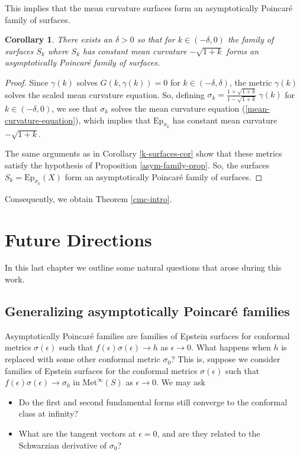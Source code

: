 \documentclass{amsart}
\newtheorem{cor}[thm]{Corollary}
\begin{document}
This implies that the mean curvature surfaces form an asymptotically Poincar\'e family of surfaces. 

\begin{cor}
There exists an $\delta > 0$ so that for $k \in (-\delta, 0)$ the family of surfaces $S_k$ where $S_k$ has constant mean curvature $-\sqrt{1+k}$ forms an asymptotically Poincar\'e family of surfaces. 
\end{cor}

\begin{proof}
Since $\gamma(k)$ solves $G(k,\gamma(k)) = 0$ for $k \in (-\delta,\delta)$, the metric $\gamma(k)$ solves the scaled mean curvature equation. 
So, defining $\sigma_k = \frac{1 + \sqrt{1+k}}{1 - \sqrt{1+k}} \ \gamma(k)$ for $k \in (-\delta,0)$, we see that $\sigma_k$ solves the mean curvature equation (\ref{mean-curvature-equation}), which implies that $\mathrm{Ep}_{\sigma_k}$ has constant mean curvature $-\sqrt{1+k}$.

The same arguments as in Corollary \ref{k-surfaces-cor} show that these metrics satisfy the hypothesis of Proposition \ref{asym-family-prop}.
So, the surfaces $S_k = \mathrm{Ep}_{\sigma_{k}}(X)$ form an asymptotically Poincar\'e family of surfaces. 
\end{proof}

Consequently, we obtain Theorem \ref{cmc-intro}.


\section{Future Directions}


In this last chapter we outline some natural questions that arose during this work.



\subsection{Generalizing asymptotically Poincar\'e families}



Asymptotically Poincar\'e families are families of Epstein surfaces for conformal metrics $\sigma(\epsilon)$ such that $f(\epsilon)\sigma(\epsilon) \to h$ as $\epsilon \to 0$.
What happens when $h$ is replaced with some other conformal metric $\sigma_0$?
This is, suppose we consider families of Epstein surfaces for the conformal metrics $\sigma(\epsilon)$ such that $f(\epsilon)\sigma(\epsilon) \to \sigma_0$ in $\mathrm{Met}^\infty(S)$ as $\epsilon \to 0$.
We may ask
\begin{itemize}
\item Do the first and second fundamental forms still converge to the conformal class at infinity? 
\item What are the tangent vectors at $\epsilon = 0$, and are they related to the Schwarzian derivative of $\sigma_0$? 
\end{itemize}
\end{document}
